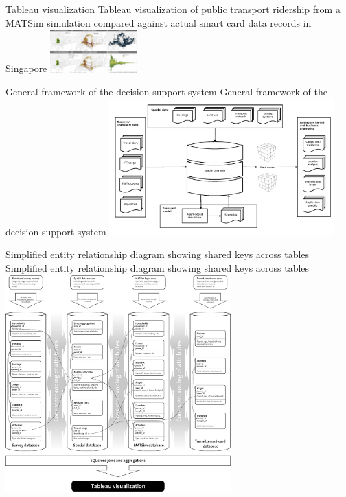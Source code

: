 \createfigure%
{Tableau visualization}%
{Tableau visualization of public transport ridership from a MATSim simulation compared against actual smart card data records in Singapore}%
{\label{fig:analyticsTableau}}%
{\includegraphics[width=0.25\textwidth, angle=0]{extending/figures/businessanalytics/tableau.png}}%
{}

\createfigure%
{General framework of the decision support system}%
{General framework of the decision support system}%
{\label{fig:analyticsFramework}}%
{\includegraphics[width=0.65\textwidth, angle=0]{extending/figures/businessanalytics/general}}%
{}

\createfigure%
{Simplified entity relationship diagram showing shared keys across tables}%
{Simplified entity relationship diagram showing shared keys across tables}%
{\label{fig:analyticsERD}}%
{\includegraphics[width=0.65\textwidth, angle=0]{extending/figures/businessanalytics/schema}}%
{}


